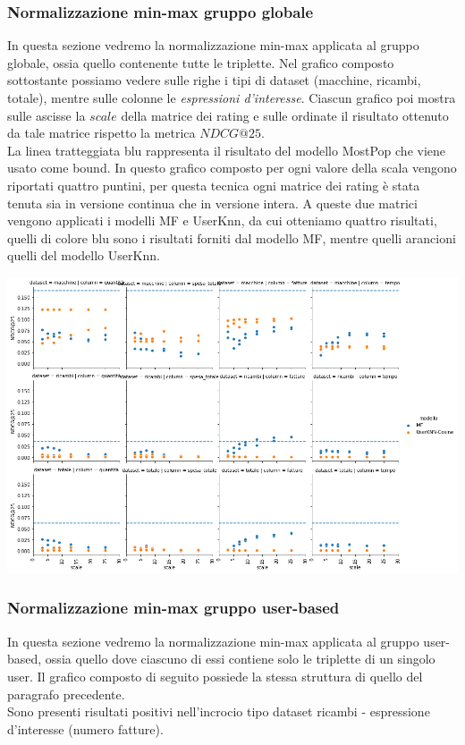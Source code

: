 \subsubsection{Normalizzazione min-max gruppo globale}
In questa sezione vedremo la normalizzazione min-max applicata al gruppo globale, ossia quello contenente tutte le triplette.
Nel grafico composto sottostante possiamo vedere sulle righe i tipi di dataset (macchine, ricambi, totale), mentre sulle colonne le \textit{espressioni d'interesse}. Ciascun grafico poi mostra sulle ascisse la $scale$ della matrice dei rating e sulle ordinate il risultato ottenuto da tale matrice rispetto la metrica $NDCG@25$. \\
La linea tratteggiata blu rappresenta il risultato del modello MostPop che viene usato come bound.
In questo grafico composto per ogni valore della scala vengono riportati quattro puntini, per questa tecnica ogni matrice dei rating è stata tenuta sia in versione continua che in versione intera. A queste due matrici vengono applicati i modelli MF e UserKnn, da cui otteniamo quattro risultati, quelli di colore blu sono i risultati forniti dal modello MF, mentre quelli arancioni quelli del modello UserKnn.

\includegraphics[width=16cm]{figures/risultati_minmax_globale.png}

\subsubsection{Normalizzazione min-max gruppo user-based}
In questa sezione vedremo la normalizzazione min-max applicata al gruppo user-based, ossia quello dove ciascuno di essi contiene solo le triplette di un singolo user. Il grafico composto di seguito possiede la stessa struttura di quello del paragrafo precedente.\\
Sono presenti risultati positivi nell'incrocio tipo dataset ricambi - espressione d'interesse (numero fatture).\\

